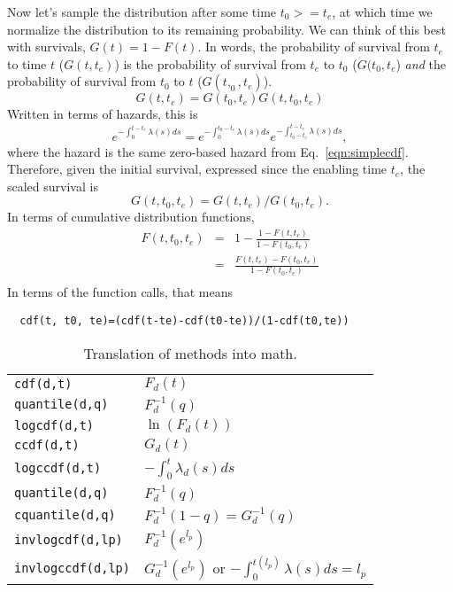 \documentclass{article}
\newcommand{\code}[1]{\texttt{#1}}
\begin{document}
Now let's sample the distribution after some time $t_0>=t_e$, at which time
we normalize the distribution to its remaining probability. We can
think of this best with survivals, $G(t)=1-F(t)$. In words, the probability of
survival from $t_e$ to time $t$ ($G(t,t_e)$) is the probability
of survival from $t_e$ to $t_0$ ($G(t_0,t_e$)
\emph{and} the probability of survival from $t_0$ to $t$ ($G(t,_0,t_e)$).
\begin{equation}
  G(t,t_e)=G(t_0,t_e)G(t,t_0,t_e)
\end{equation}
Written in terms of hazards, this is
\begin{equation}
  e^{-\int_{0}^{t-t_e} \lambda(s)ds}=e^{-\int_{0}^{t_0-t_e} \lambda(s)ds}
    e^{-\int_{t_0-t_e}^{t-t_e} \lambda(s)ds},
\end{equation}
where the hazard is the same zero-based hazard from Eq.~\ref{eqn:simplecdf}.
Therefore, given the initial survival, expressed since the enabling time $t_e$,
the scaled survival is
\begin{equation}
  G(t,t_0,t_e)=G(t,t_e)/G(t_0,t_e).
\end{equation}
In terms of cumulative distribution functions,
\begin{eqnarray}
  F(t,t_0,t_e)&=&1-\frac{1-F(t,t_e)}{1-F(t_0,t_e)} \\
          &=&\frac{F(t,t_e)-F(t_0,t_e)}{1-F(t_0,t_e)}\label{eqn:shiftcum} \\
\end{eqnarray}
In terms of the function calls, that means
\begin{NoHyper}\begin{lstlisting}
  cdf(t, t0, te)=(cdf(t-te)-cdf(t0-te))/(1-cdf(t0,te))
\end{lstlisting}
\end{NoHyper}

\begin{table}
\begin{tabular}{ll} \hline
\code{cdf(d,t)} & $F_d(t)$ \\
\code{quantile(d,q)} & $F_d^{-1}(q)$ \\
\code{logcdf(d,t)} & $\ln(F_d(t))$ \\
\code{ccdf(d,t)} & $G_d(t)$ \\
\code{logccdf(d,t)} & $-\int_0^t \lambda_d(s)ds$ \\
\code{quantile(d,q)} & $F_d^{-1}(q)$ \\
\code{cquantile(d,q)} & $F_d^{-1}(1-q)=G_d^{-1}(q)$ \\
\code{invlogcdf(d,lp)} & $F_d^{-1}(e^{l_p})$ \\
\code{invlogccdf(d,lp)} & $G_d^{-1}(e^{l_p})$ or $-\int_0^{t(l_p)}\lambda(s)ds=l_p$ \\\hline
\end{tabular}
\caption{Translation of methods into math.\label{fig:methodmath}}
\end{table}
\end{document}
